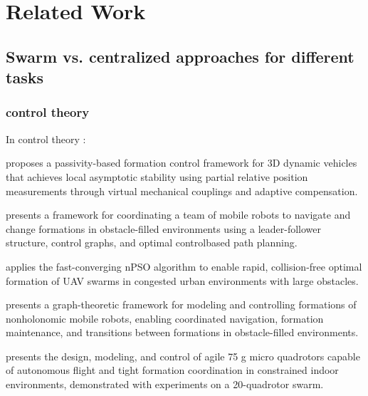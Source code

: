 \chapter{Related Work}
\label{ch2}


\section{Swarm vs. centralized approaches for different tasks}

\subsection{control theory}

In control theory :

\cite{stacey2015passivity} proposes a passivity-based formation control framework for 3D dynamic vehicles that achieves local asymptotic stability using partial relative position measurements through virtual mechanical couplings and adaptive compensation.

\cite{desai1999control} presents a framework for coordinating a team of mobile robots to navigate and change formations in obstacle-filled environments using a leader-follower structure, control graphs, and optimal control\-based path planning.

\cite{spanogianopoulos2017fast} applies the fast-converging nPSO algorithm to enable rapid, collision-free optimal formation of UAV swarms in congested urban environments with large obstacles.

\cite{desai2002modeling} presents a graph-theoretic framework for modeling and controlling formations of nonholonomic mobile robots, enabling coordinated navigation, formation maintenance, and transitions between formations in obstacle-filled environments.

\cite{kushleyev2013towards} presents the design, modeling, and control of agile 75 g micro quadrotors capable of autonomous flight and tight formation coordination in constrained indoor environments, demonstrated with experiments on a 20-quadrotor swarm.


